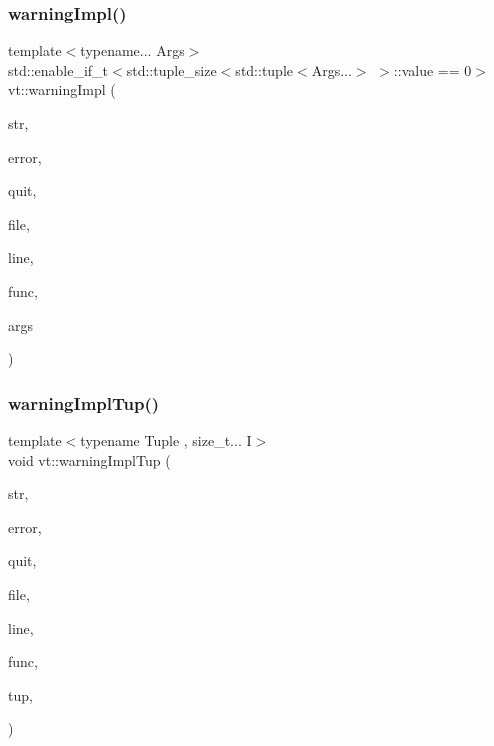 \mbox{\label{namespacevt_a118ef4729cf1e1516a3efef8da49efbf}} 
\subsubsection{\texorpdfstring{warning\+Impl()}{warningImpl()}\hspace{0.1cm}{\footnotesize\ttfamily [2/2]}}
{\footnotesize\ttfamily template$<$typename... Args$>$ \\
std\+::enable\+\_\+if\+\_\+t$<$std\+::tuple\+\_\+size$<$std\+::tuple$<$Args...$>$ $>$\+::value == 0$>$ vt\+::warning\+Impl (\begin{DoxyParamCaption}\item[{std\+::string const \&}]{str,  }\item[{\hyperlink{namespacevt_a793764d753923abc3d32929870beb485}{Error\+Code\+Type}}]{error,  }\item[{bool}]{quit,  }\item[{std\+::string const \&}]{file,  }\item[{int const}]{line,  }\item[{std\+::string const \&}]{func,  }\item[{Args \&\&...}]{args }\end{DoxyParamCaption})\hspace{0.3cm}{\ttfamily [inline]}}

\mbox{\label{namespacevt_af998935c41a6f414a373f182156d72e3}} 
\subsubsection{\texorpdfstring{warning\+Impl\+Tup()}{warningImplTup()}}
{\footnotesize\ttfamily template$<$typename Tuple , size\+\_\+t... I$>$ \\
void vt\+::warning\+Impl\+Tup (\begin{DoxyParamCaption}\item[{std\+::string const \&}]{str,  }\item[{\hyperlink{namespacevt_a793764d753923abc3d32929870beb485}{Error\+Code\+Type}}]{error,  }\item[{bool}]{quit,  }\item[{std\+::string const \&}]{file,  }\item[{int const}]{line,  }\item[{std\+::string const \&}]{func,  }\item[{Tuple \&\&}]{tup,  }\item[{std\+::index\+\_\+sequence$<$ I... $>$}]{ }\end{DoxyParamCaption})\hspace{0.3cm}{\ttfamily [inline]}}



